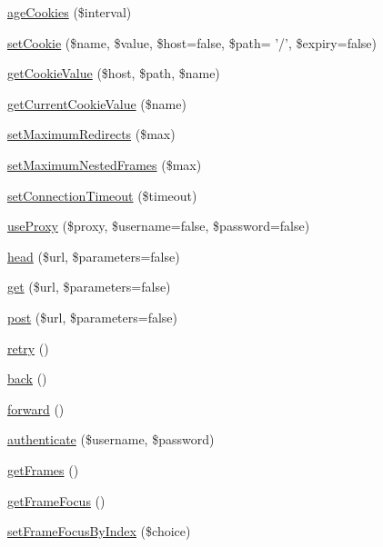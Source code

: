 \begin{DoxyCompactItemize}
\item 
\hyperlink{class_simple_browser_aefb6d3f834a1b34b91ea3a1329255739}{ageCookies} (\$interval)
\item 
\hyperlink{class_simple_browser_a8f451a9d2285cde6ec22e976ce0655db}{setCookie} (\$name, \$value, \$host=false, \$path= '/', \$expiry=false)
\item 
\hyperlink{class_simple_browser_a3af84b937fb74b4e53b636b2aa417c90}{getCookieValue} (\$host, \$path, \$name)
\item 
\hyperlink{class_simple_browser_a05080e0fe83a27c53d480bfaac80dd77}{getCurrentCookieValue} (\$name)
\item 
\hyperlink{class_simple_browser_af5e0f1852c449c6ee4325bd48960161d}{setMaximumRedirects} (\$max)
\item 
\hyperlink{class_simple_browser_a18e17ed56274ec6ac5e4e53c81ae51dc}{setMaximumNestedFrames} (\$max)
\item 
\hyperlink{class_simple_browser_a689fac1e736776ccd1d3e0e0834ef048}{setConnectionTimeout} (\$timeout)
\item 
\hyperlink{class_simple_browser_afcbae738b78039eaf3995f1fb4813b4c}{useProxy} (\$proxy, \$username=false, \$password=false)
\item 
\hyperlink{class_simple_browser_aff49ab3df60d3613fdc7a36bd7755f13}{head} (\$url, \$parameters=false)
\item 
\hyperlink{class_simple_browser_a315bb345eed9aec7e0854379b1c8008a}{get} (\$url, \$parameters=false)
\item 
\hyperlink{class_simple_browser_a3886cc42827b3365e3e9f418f3d17323}{post} (\$url, \$parameters=false)
\item 
\hyperlink{class_simple_browser_a0d32478aff0c58024a9eca0ba2747555}{retry} ()
\item 
\hyperlink{class_simple_browser_a2fda047202943fe6bfd3708cd557c3d0}{back} ()
\item 
\hyperlink{class_simple_browser_afa6e04c5baef77dd916a61c8f69c1ab2}{forward} ()
\item 
\hyperlink{class_simple_browser_ae0f4f39b95050c895049df6d5e48b731}{authenticate} (\$username, \$password)
\item 
\hyperlink{class_simple_browser_a07cc18881732a8c404493deb9fdcbb51}{getFrames} ()
\item 
\hyperlink{class_simple_browser_aff692953670dc5aedc140df66e3570c2}{getFrameFocus} ()
\item 
\hyperlink{class_simple_browser_a942e65249c816e9eb63d068f41e516f7}{setFrameFocusByIndex} (\$choice)

\end{DoxyCompactItemize}

